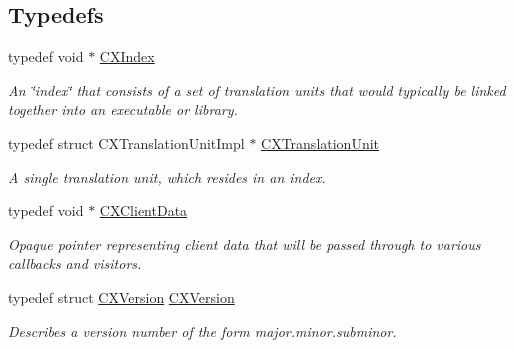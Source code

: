 \subsection*{Typedefs}
\begin{DoxyCompactItemize}
\item 
\mbox{\label{group__CINDEX_gae039c2574bfd75774ca7a9a3e55910cb}} 
typedef void $\ast$ \hyperlink{group__CINDEX_gae039c2574bfd75774ca7a9a3e55910cb}{C\+X\+Index}
\begin{DoxyCompactList}\small\item\em An \char`\"{}index\char`\"{} that consists of a set of translation units that would typically be linked together into an executable or library. \end{DoxyCompactList}\item 
\mbox{\label{group__CINDEX_gacdb7815736ca709ce9a5e1ec2b7e16ac}} 
typedef struct C\+X\+Translation\+Unit\+Impl $\ast$ \hyperlink{group__CINDEX_gacdb7815736ca709ce9a5e1ec2b7e16ac}{C\+X\+Translation\+Unit}
\begin{DoxyCompactList}\small\item\em A single translation unit, which resides in an index. \end{DoxyCompactList}\item 
\mbox{\label{group__CINDEX_gacfa40c3de26d228c0d898403c2c21612}} 
typedef void $\ast$ \hyperlink{group__CINDEX_gacfa40c3de26d228c0d898403c2c21612}{C\+X\+Client\+Data}
\begin{DoxyCompactList}\small\item\em Opaque pointer representing client data that will be passed through to various callbacks and visitors. \end{DoxyCompactList}\item 
\mbox{\label{group__CINDEX_ga7f7575bbf8434fc8ef9e112dc8f156be}} 
typedef struct \hyperlink{structCXVersion}{C\+X\+Version} \hyperlink{group__CINDEX_ga7f7575bbf8434fc8ef9e112dc8f156be}{C\+X\+Version}
\begin{DoxyCompactList}\small\item\em Describes a version number of the form major.\+minor.\+subminor. \end{DoxyCompactList}\end{DoxyCompactItemize}
